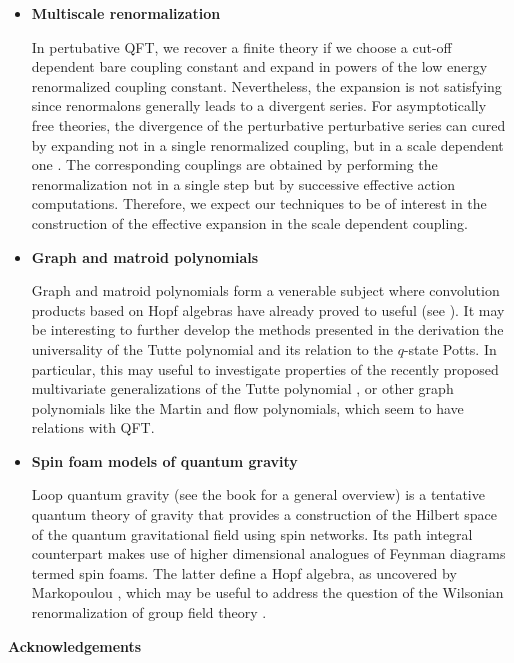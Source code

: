 \documentclass[12pt,here,feynmf]{article}
\begin{document}
\begin{itemize} 
\item
{\bf Multiscale renormalization}

In pertubative QFT, we recover a finite theory if we choose a cut-off dependent bare coupling constant and expand in powers of the low energy renormalized coupling constant. Nevertheless, the expansion is not satisfying since renormalons generally leads to a divergent series. For asymptotically free theories, the divergence of the perturbative perturbative series can cured by expanding not in a single renormalized coupling, but in a scale dependent one \cite{constructive}. The corresponding couplings are obtained by performing the renormalization not in a single step but by successive effective action computations. Therefore, we expect our techniques to be of interest in the construction of the effective expansion in the scale dependent coupling. 

\item
{\bf Graph and matroid polynomials}

Graph and matroid polynomials form a venerable subject where convolution products based on Hopf algebras have already proved to useful (see \cite{KRS}). It may be interesting to further develop the methods presented in the derivation  the universality of the Tutte polynomial and its relation to the $q$-state Potts. In particular, this may useful to investigate properties of the recently proposed multivariate generalizations of the Tutte polynomial \cite{sokal}, or other graph polynomials like the Martin and flow polynomials, which seem to have relations with QFT.   


\item
{\bf Spin foam models of quantum gravity}

Loop quantum gravity (see the book \cite{rovelli} for a general overview) is a tentative quantum theory of gravity that provides a construction of the Hilbert space of the quantum gravitational field using spin networks. Its path integral counterpart makes use of higher dimensional analogues of Feynman diagrams termed spin foams. The latter define a Hopf algebra, as uncovered by Markopoulou \cite{Fotini}, which may be useful to address the question of  the Wilsonian renormalization of group field theory \cite{oriti}.


\end{itemize}



\noindent

{\bf Acknowledgements}
\end{document}
